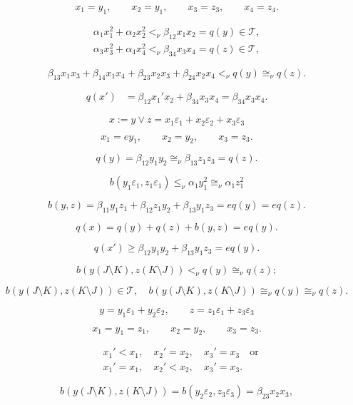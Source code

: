 \documentclass{article}
\begin{document}
$$x_1=y_1,\qquad x_2=y_1,\qquad x_3=z_3,\qquad x_4=z_4.$$

\begin{gather}
{\alpha}_1x_1^2+{\alpha}_2x_2^2<_\nu{\beta}_{12}x_1x_2=q(y)\in {\mathcal T},\\
{\alpha}_3x_3^2+{\alpha}_4x_4^2<_\nu{\beta}_{34}x_3x_4=q(z)\in {\mathcal T},
\end{gather}

$${\beta}_{13}x_1x_3+{\beta}_{14}x_1x_4+{\beta}_{23}x_2x_3+{\beta}_{24}x_2x_4<_\nu
q(y)\cong_\nu q(z).$$

\begin{align*}
q(x')&={\beta}_{12}x_1'x_2+{\beta}_{34}x_3x_4 = {\beta}_{34}x_3x_4.
\end{align*}

$$x:=y\vee z=x_1{\varepsilon}_1+x_2{\varepsilon}_2+x_3{\varepsilon}_3$$

$$x_1=ey_1,\qquad x_2=y_2,\qquad x_3=z_3.$$

$$q(y)={\beta}_{12}y_1y_2\cong_\nu{\beta}_{13}z_1z_3=q(z).$$

$$b(y_1{\varepsilon}_1,z_1{\varepsilon}_1)\le_\nu
{\alpha}_1y_1^2\cong_\nu{\alpha}_1z_1^2$$

$$b(y,z)={\beta}_{11}y_1z_1+{\beta}_{12}z_1y_2+{\beta}_{13}y_1z_3=eq(y)=eq(z).$$

$$q(x)=q(y)+q(z)+b(y,z)=eq(y).$$

$$q(x')\ge {\beta}_{12}y_1y_2+{\beta}_{13}y_1z_3=eq(y).$$

\begin{equation}\label{eq:7.10}
b(y(J\setminus K),z(K\setminus J))<_\nu q(y)\cong_\nu q(z);
\end{equation}

\begin{equation}\label{eq:7.11}
b(y(J\setminus K),z(K\setminus J))\in {\mathcal T},\quad
b(y(J\setminus K),z(K\setminus J))\cong_\nu q(y)\cong_\nu q(z).
\end{equation}

$$y=y_1{\varepsilon}_1+y_2{\varepsilon}_2,\qquad
z=z_1{\varepsilon}_1+z_3{\varepsilon}_3$$

$$x_1=y_1 = z_1,\qquad x_2=y_2,\qquad x_3=z_3.$$

\begin{align*}
&x_1'<x_1,\quad x_2'=x_2,\quad x_3'=x_3\quad\text{or}\\
&x_1'=x_1,\quad x_2'<x_2,\quad x_3'=x_3.
\end{align*}

$$b(y(J\setminus K),z(K\setminus
J))=b(y_2{\varepsilon}_2,z_3{\varepsilon}_3)={\beta}_{23}x_2x_3,$$
\end{document}
